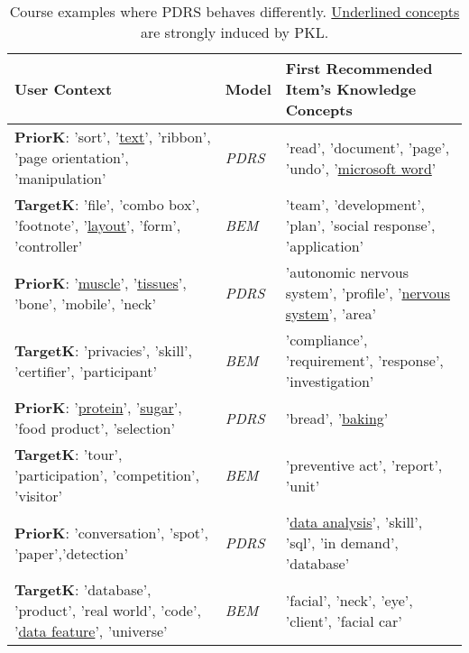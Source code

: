 \begin{table*}[h!]
\footnotesize
\abovecaptionskip -0.5mm
\begin{tabular}{|l|ll|}
\hline
\textbf{User Context}  & \textbf{Model} & 
\textbf{First Recommended Item's Knowledge Concepts}  \\ 
\hline
\textbf{PriorK}: 'sort', '\underline{text}', 'ribbon', 'page orientation', 'manipulation' &    \textit{PDRS}  & 'read', 'document', 'page', 'undo', '\underline{microsoft word}'     \\ \cline{2-3}
\textbf{TargetK}: 'file', 'combo box', 'footnote', '\underline{layout}', 'form', 'controller' & \textit{BEM}   & 'team', 'development', 'plan', 'social response', 'application'    \\ 
 
\hline
\textbf{PriorK}: '\underline{muscle}', '\underline{tissues}', 'bone', 'mobile', 'neck' & 
    \textit{PDRS}  & 'autonomic nervous system', 'profile', '\underline{nervous system}', 'area'    \\ \cline{2-3}
\textbf{TargetK}: 'privacies', 'skill', 'certifier', 'participant' & \textit{BEM}   & 'compliance', 'requirement', 'response', 'investigation'     \\ 
  
\hline
\textbf{PriorK}: '\underline{protein}', '\underline{sugar}', 'food product', 'selection' & \textit{PDRS}  & 'bread', '\underline{baking}' \\ \cline{2-3}
\textbf{TargetK}: 'tour', 'participation', 'competition', 'visitor' & \textit{BEM}   & 'preventive act', 'report', 'unit'       \\ 
  
\hline
\textbf{PriorK}: 'conversation', 'spot', 'paper','detection' &  \textit{PDRS}  & '\underline{data analysis}', 'skill', 'sql', 'in demand', 'database'    \\ \cline{2-3}
\textbf{TargetK}: 'database', 'product', 'real world', 'code', '\underline{data feature}', 'universe' & \textit{BEM}   & 'facial', 'neck', 'eye', 'client', 'facial car'    \\ 
\hline
\end{tabular}
\caption{Course examples where PDRS behaves differently. \underline{Underlined concepts} are strongly induced by PKL.}
\label{tab:micro}
\end{table*}

